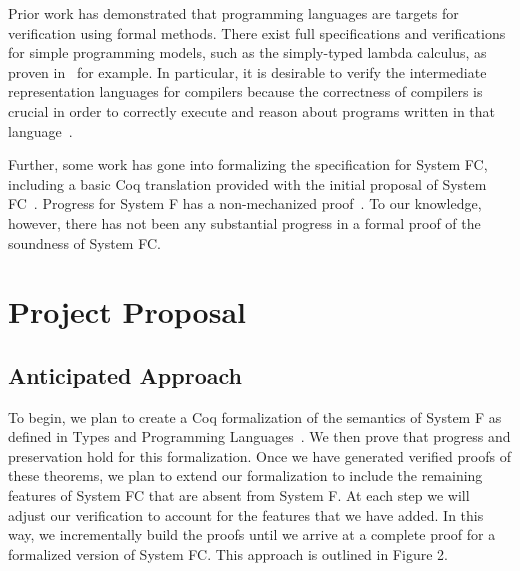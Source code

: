 \documentclass{sig-alternate}
\begin{document}
Prior work has demonstrated that programming languages are targets for verification using 
formal methods. There exist full specifications and verifications for simple programming
models, such as the simply-typed lambda calculus, as proven in~\cite{Pierce:SF} for example. In particular, it is desirable to verify the intermediate representation languages for compilers because the correctness of compilers is crucial in order to correctly execute and reason about programs written in that language~\cite{Zhao:2012:FLI:2103656.2103709}.

Further, some work has gone into formalizing the specification for System FC, including a basic 
Coq translation provided with the initial proposal of System FC~\cite{conf/tldi/SulzmannCJD07}. 
Progress for System F has a non-mechanized proof~\cite{Girard:1989:PT:64805}. To our knowledge, however, there has not been any substantial progress in a formal 
proof of the soundness of System FC.

\section{Project Proposal}
\label{sec:project_proposal}

\subsection{Anticipated Approach}
\label{subsec:approach}
To begin, we plan to create a Coq formalization of the semantics of System F as defined in Types and Programming Languages~\cite{Pierce:SF}. We then prove that progress and preservation hold for this formalization. Once we have generated verified proofs of these theorems, we plan to extend our formalization to include the remaining features of System FC that are absent from System F.  At each step we will adjust our verification to account for the features that we have added. In this way, we incrementally build the proofs until we arrive at a complete proof for a formalized version of System FC. This approach is outlined in Figure 2.
\end{document}
